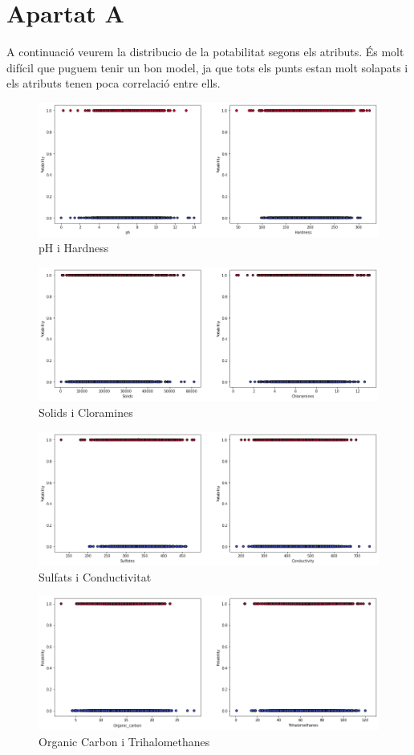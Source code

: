 \documentclass{article}
\begin{document}
	\section*{Apartat A}
	A continuació veurem la distribucio de la potabilitat segons els atributs. És molt difícil que puguem tenir un bon model, ja que tots els punts estan molt solapats i els atributs tenen poca correlació entre ells.\\
\begin{figure}[!h]
	\centering
	\includegraphics[width=0.7\linewidth]{../images/aa-ph}
	\caption*{pH i Hardness}
	\label{fig:aa-ph}
\end{figure}
\begin{figure}[!h]
	\centering
	\includegraphics[width=0.7\linewidth]{../images/aa-solids}
	\caption*{Solids i Cloramines}
	\label{fig:aa-ph}
\end{figure}
\begin{figure}[!h]
	\centering
	\includegraphics[width=0.7\linewidth]{../images/aa-sulfats}
	\caption*{Sulfats i Conductivitat}
	\label{fig:aa-ph}
\end{figure}
\clearpage
\begin{figure}[!h]
	\centering
	\includegraphics[width=0.7\linewidth]{../images/aa-organic-carbon}
	\caption*{Organic Carbon i Trihalomethanes}
	\label{fig:aa-ph}
\end{figure}
\end{document}
